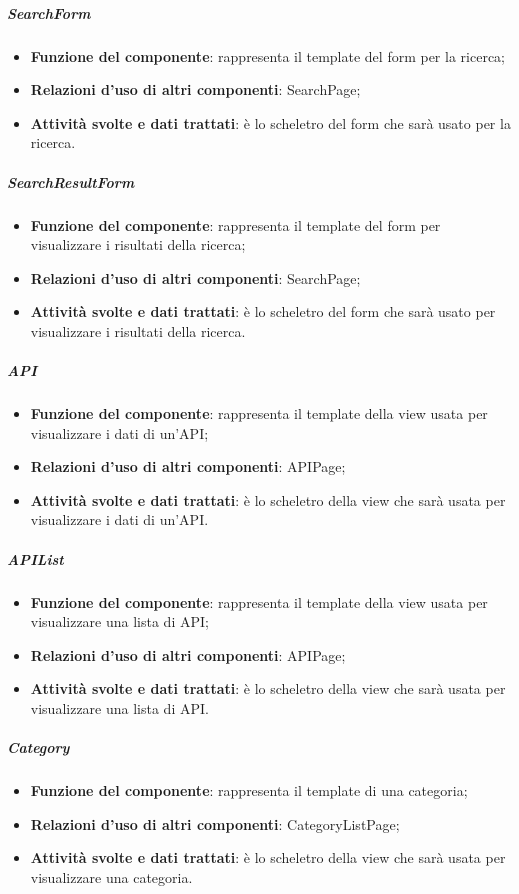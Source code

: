 \subparagraph{SearchForm}
\begin{itemize}
	\item \textbf{Funzione del componente}: rappresenta il template del form per la ricerca;
	\item \textbf{Relazioni d’uso di altri componenti}: SearchPage;
	\item \textbf{Attività svolte e dati trattati}:  \`{e} lo scheletro del form che sar\`{a} usato per la ricerca.
\end{itemize}

\subparagraph{SearchResultForm}
\begin{itemize}
	\item \textbf{Funzione del componente}: rappresenta il template del form per visualizzare i risultati della ricerca;
	\item \textbf{Relazioni d’uso di altri componenti}: SearchPage;
	\item \textbf{Attività svolte e dati trattati}: \`{e} lo scheletro del form che sar\`{a} usato per visualizzare i risultati della ricerca.
\end{itemize}

\subparagraph{API}
\begin{itemize}
	\item \textbf{Funzione del componente}:  rappresenta il template della view usata per visualizzare i dati di un'API;
	\item \textbf{Relazioni d’uso di altri componenti}: APIPage;
	\item \textbf{Attività svolte e dati trattati}: \`{e} lo scheletro della view che sar\`{a} usata per visualizzare i dati di un'API.
\end{itemize}

\subparagraph{APIList}
\begin{itemize}
	\item \textbf{Funzione del componente}: rappresenta il template della view usata per visualizzare una lista di API;
	\item \textbf{Relazioni d’uso di altri componenti}: APIPage;
	\item \textbf{Attività svolte e dati trattati}: \`{e} lo scheletro della view che sar\`{a} usata per visualizzare una lista di API.
\end{itemize}

\subparagraph{Category}
\begin{itemize}
	\item \textbf{Funzione del componente}: rappresenta il template di una categoria;
	\item \textbf{Relazioni d’uso di altri componenti}: CategoryListPage;
	\item \textbf{Attività svolte e dati trattati}: \`{e} lo scheletro della view che sar\`{a} usata per visualizzare una categoria.
\end{itemize}

